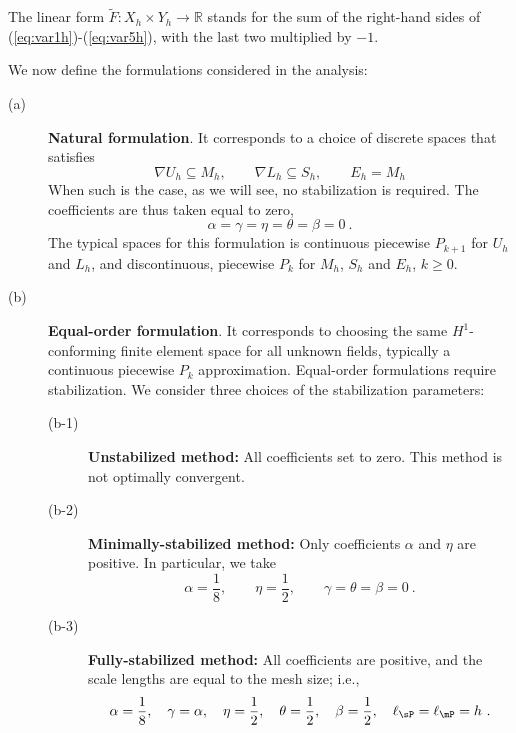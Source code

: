 The linear form $\tilde{F}:X_h\times Y_h \to \mathbb{R}$ stands for the sum of the right-hand sides of (\ref{eq:var1h})-(\ref{eq:var5h}), with the last two multiplied by $-1$.

We now define the formulations considered in the analysis:

\begin{description}
\item[(a)] {\bf Natural formulation}. It corresponds to a choice of discrete spaces that satisfies
$$
\nabla U_h \subseteq M_h, \qquad \nabla L_h \subseteq S_h, \qquad E_h = M_h 
$$
When such is the case, as we will see, no stabilization is required. The coefficients are thus taken equal to zero,
$$
\alpha = \gamma = \eta = \theta = \beta = 0~.
$$
The typical spaces for this formulation is continuous piecewise $P_{k+1}$ for $U_h$ and $L_h$, and discontinuous, piecewise $P_{k}$ for $M_h$, $S_h$ and $E_h$, $k \ge 0$.

\item[(b)] {\bf Equal-order formulation}. It corresponds to choosing the same $H^1$-conforming finite element space for all unknown fields, typically a continuous piecewise $P_k$ approximation. Equal-order formulations require stabilization. We consider three choices of the stabilization parameters:

\begin{description}

\item[(b-1)] {\bf Unstabilized method:}
All coefficients set to zero. This method is not optimally convergent.

\item[(b-2)] {\bf Minimally-stabilized method:} Only coefficients $\alpha$ and $\eta$ are positive. In particular, we take
$$
\alpha = \frac{1}{8}, \qquad \eta = \frac12, \qquad \gamma = \theta = \beta = 0~.
$$

\item[(b-3)] {\bf Fully-stabilized method:} All coefficients are positive, and the scale lengths are equal to the mesh size; i.e.,
	\begin{equation}
	\alpha = \frac{1}{8}, 
	\quad \gamma=\alpha, \quad \eta = \frac12,\quad \theta=\frac12,\quad \beta=\frac12,
	\quad \ell_{\sP} = \ell_{\mP} = h~. \label{eq:paramsopt}
	\end{equation}

\end{description}

\end{description} 


